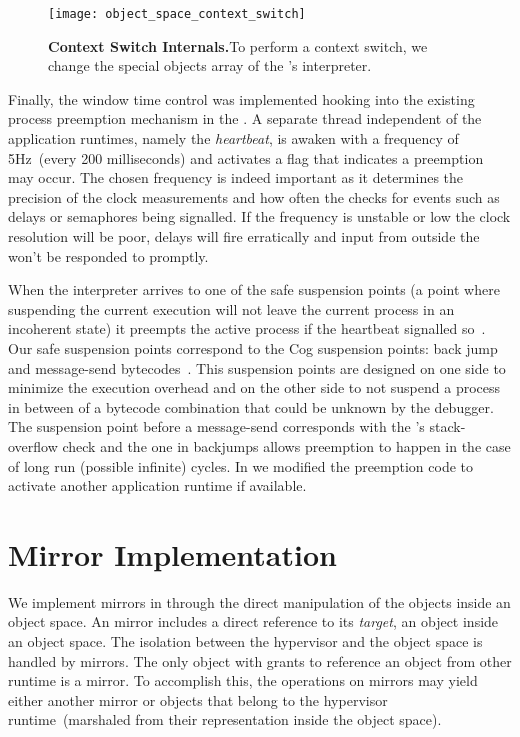 \begin{figure}[ht]
\begin{center}
\texttt{[image: object\_space\_context\_switch]}
\caption{\textbf{Context Switch Internals.}To perform a context switch, we change the special objects array of the \VM's interpreter.\label{fig:context_switch}}
\end{center}
\end{figure}

Finally, the window time control was implemented hooking into the existing process preemption mechanism in the \VM. A separate \VM thread independent of the application runtimes, namely the \emph{heartbeat}, is awaken with a frequency of 5Hz~(\ie every 200 milliseconds) and activates a flag that indicates a preemption may occur. The chosen frequency is indeed important as it determines the precision of the clock measurements and how often the \VM checks for events such as delays or semaphores being signalled. If the frequency is unstable or low the clock resolution will be poor, delays will fire erratically and input from outside the \VM won't be responded to promptly.

When the \VM interpreter arrives to one of the safe suspension points (\ie a point where suspending the current execution will not leave the current process in an incoherent state) it preempts the active process if the heartbeat signalled so~\cite{Deut84a}. Our safe suspension points correspond to the Cog \VM suspension points: back jump and message-send bytecodes~\cite{Mira11a}. This suspension points are designed on one side to minimize the execution overhead and on the other side to not suspend a process in between of a bytecode combination that could be unknown by the debugger. The suspension point before a message-send corresponds with the \VM's stack-overflow check and the one in backjumps allows preemption to happen in the case of long run (possible infinite) cycles. In \Vtt we modified the preemption code to activate another application runtime if available.

\section{\Vtt Mirror Implementation}\label{sec:implementation_mirrors}

We implement mirrors in \Vtt through the direct manipulation of the objects inside an object space. An \Vtt mirror includes a direct reference to its \emph{target}, an object inside an object space. The isolation between the hypervisor and the object space is handled by mirrors. The only object with grants to reference an object from other runtime is a mirror. To accomplish this, the operations on mirrors may yield either another mirror or objects that belong to the hypervisor runtime~(marshaled from their representation inside the object space).

